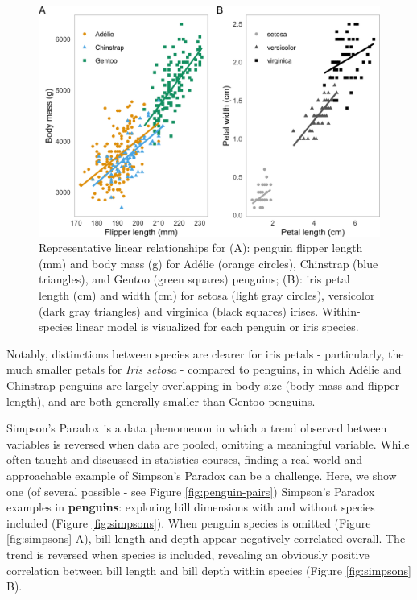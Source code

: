 \begin{Schunk}
\begin{figure}[htbp]

{\centering \includegraphics[width=1\linewidth]{figs/linear-example-1} 

}

\caption[Representative linear relationships for (A)]{Representative linear relationships for (A): penguin flipper length (mm) and body mass (g) for Adélie (orange circles), Chinstrap (blue triangles), and Gentoo (green squares) penguins; (B): iris petal length (cm) and width (cm) for setosa (light gray circles), versicolor (dark gray triangles) and virginica (black squares) irises. Within-species linear model is visualized for each penguin or iris species.}\label{fig:linear-example}
\end{figure}
\end{Schunk}

Notably, distinctions between species are clearer for iris petals -
particularly, the much smaller petals for \emph{Iris setosa} - compared
to penguins, in which Adélie and Chinstrap penguins are largely
overlapping in body size (body mass and flipper length), and are both
generally smaller than Gentoo penguins.

Simpson's Paradox is a data phenomenon in which a trend observed between
variables is reversed when data are pooled, omitting a meaningful
variable. While often taught and discussed in statistics courses,
finding a real-world and approachable example of Simpson's Paradox can
be a challenge. Here, we show one (of several possible - see Figure
\ref{fig:penguin-pairs}) Simpson's Paradox examples in
\textbf{penguins}: exploring bill dimensions with and without species
included (Figure \ref{fig:simpsons}). When penguin species is omitted
(Figure \ref{fig:simpsons} A), bill length and depth appear negatively
correlated overall. The trend is reversed when species is included,
revealing an obviously positive correlation between bill length and bill
depth within species (Figure \ref{fig:simpsons} B).

